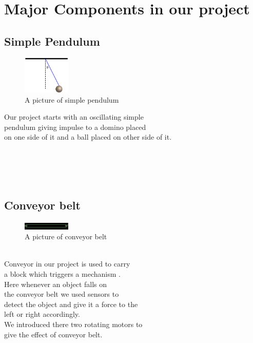 \section{Major Components in our project}

\subsection{Simple Pendulum}
\begin{figure}
	\caption{A picture of simple pendulum}
	\begin{center}
	 \includegraphics[width=0.2\textwidth]{./doc/pendulum.png}%
	 \end{center}
	
\end{figure}

\begin{frame}
\centering


\begin{flushleft}

\end{flushleft}
Our project starts with an oscillating simple\\ pendulum giving impulse to a domino placed\\ on one side of it and a ball placed on other side of it.\\ \\ \\ \\ \\
\end{frame}

\subsection{Conveyor belt}
\begin{figure}
	\caption{A picture of conveyor belt}
	\centering
	 \includegraphics[width=0.2\textwidth]{./doc/conveyor.png}%
\end{figure}
\begin{frame}
\centering
\\
Conveyor in our project is used to carry\\ a block which triggers a mechanism . \\
Here whenever an object falls on\\ the conveyor belt we used sensors to \\detect the object and give it a force to the \\left or right accordingly.\\We introduced there two rotating motors to\\ give the effect of conveyor belt. 
\end{frame}


